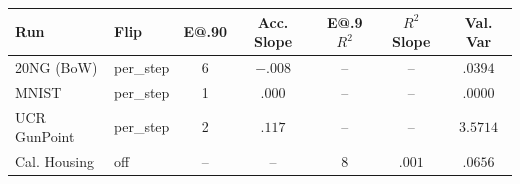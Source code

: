 \begin{tabular}{@{} l l c c c c c @{}}
\toprule
Run & Flip & E@.90 & Acc. Slope & E@.9 $R^2$ & $R^2$ Slope & Val. Var \\
\midrule
20NG (BoW) & per\_step & 6 & $-.008$ & -- & -- & $.0394$ \\
MNIST & per\_step & 1 & $.000$ & -- & -- & $.0000$ \\
UCR GunPoint & per\_step & 2 & $.117$ & -- & -- & $3.5714$ \\
Cal. Housing & off & -- & -- & 8 & $.001$ & $.0656$ \\
\bottomrule
\end{tabular}
